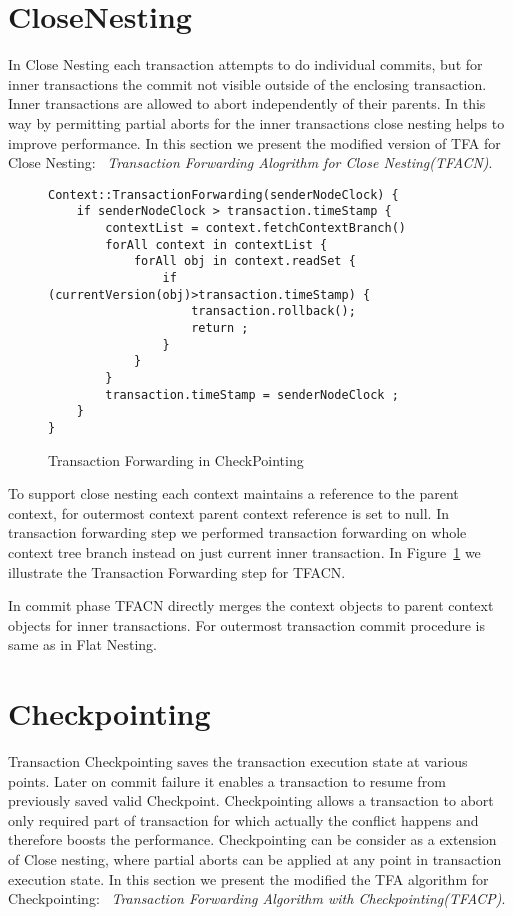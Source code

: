 \documentclass[12pt,english]{report}
\begin{document}
\section{CloseNesting} 

In Close Nesting each transaction attempts to do individual commits, but for inner transactions the commit not visible outside of the enclosing transaction. Inner transactions are allowed to abort independently of their parents. In this way by permitting partial aborts for the inner transactions close nesting helps to improve performance. In this section we present the modified version of TFA for Close Nesting: ~\emph{Transaction Forwarding Alogrithm for Close Nesting(TFACN)}.

\begin{figure}
\begin{minipage}[b]{0.9\linewidth}\centering
\begin{lstlisting}
Context::TransactionForwarding(senderNodeClock) {
	if senderNodeClock > transaction.timeStamp {
		contextList = context.fetchContextBranch()
		forAll context in contextList {
			forAll obj in context.readSet {
				if (currentVersion(obj)>transaction.timeStamp) { 
					transaction.rollback();
					return ;
				}		
			}
		}
		transaction.timeStamp = senderNodeClock ; 
	}
}
\end{lstlisting}
\end{minipage}
\caption{Transaction Forwarding in CheckPointing}
\label{Fig:CloseTFA}
\end{figure} 

To support close nesting each context maintains a reference to the parent context, for outermost context parent context reference is set to null. In transaction forwarding step we performed transaction forwarding on whole context tree branch instead on just current inner transaction. In Figure~\ref{Fig:CloseTFA} we illustrate the Transaction Forwarding step for TFACN.

In commit phase TFACN directly merges the context objects to parent context objects for inner transactions. For outermost transaction commit procedure is same as in Flat Nesting. 

\section{Checkpointing}

Transaction Checkpointing saves the transaction execution state at various points. Later on commit failure it enables a transaction to resume from previously saved valid Checkpoint. Checkpointing allows a transaction to abort only required part of transaction for which actually the conflict happens and therefore boosts the performance. Checkpointing can be consider as a extension of Close nesting, where partial aborts can be applied at any point in transaction execution state. In this section we present  the modified the TFA algorithm for Checkpointing: ~\emph{Transaction Forwarding Algorithm with Checkpointing(TFACP)}.
\end{document}

